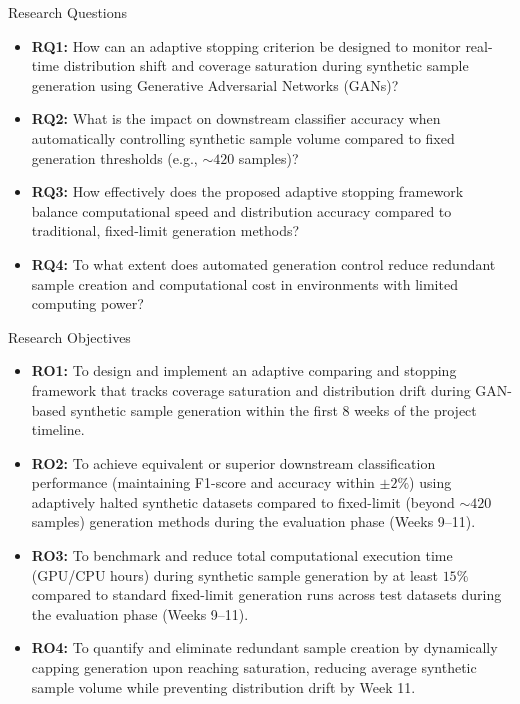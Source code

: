 \documentclass[10pt]{beamer}
\begin{document}
\begin{frame}{Research Questions}
    \begin{itemize}
        \item \textbf{RQ1:} How can an adaptive stopping criterion be designed to monitor real-time distribution shift and coverage saturation during synthetic sample generation using Generative Adversarial Networks (GANs)?
        \item \textbf{RQ2:} What is the impact on downstream classifier accuracy when automatically controlling synthetic sample volume compared to fixed generation thresholds (e.g., $\sim 420$ samples)?
        \item \textbf{RQ3:} How effectively does the proposed adaptive stopping framework balance computational speed and distribution accuracy compared to traditional, fixed-limit generation methods?
        \item \textbf{RQ4:} To what extent does automated generation control reduce redundant sample creation and computational cost in environments with limited computing power?
    \end{itemize}
\end{frame}

\begin{frame}{Research Objectives}
    \begin{itemize}
        \item \textbf{RO1:} To design and implement an adaptive comparing and stopping framework that tracks coverage saturation and distribution drift during GAN-based synthetic sample generation within the first 8 weeks of the project timeline. 
        \item \textbf{RO2:} To achieve equivalent or superior downstream classification performance (maintaining F1-score and accuracy within $\pm 2\%$) using adaptively halted synthetic datasets compared to fixed-limit (beyond $\sim 420$ samples) generation methods during the evaluation phase (Weeks 9--11).
        \item \textbf{RO3:} To benchmark and reduce total computational execution time (GPU/CPU hours) during synthetic sample generation by at least $15\%$ compared to standard fixed-limit generation runs across test datasets during the evaluation phase (Weeks 9--11).
        \item \textbf{RO4:} To quantify and eliminate redundant sample creation by dynamically capping generation upon reaching saturation, reducing average synthetic sample volume while preventing distribution drift by Week 11.
    \end{itemize}
\end{frame}
\end{document}

